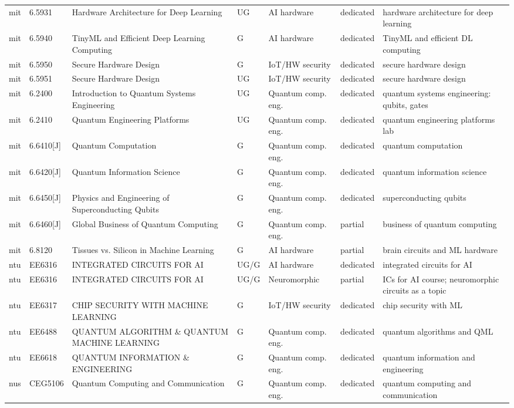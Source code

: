 \documentclass[10pt]{article}
\begin{document}
\begin{longtable}{@{}llL{4.6cm}llll@{}}
mit & 6.5931 & Hardware Architecture for Deep Learning & UG & AI hardware & dedicated & hardware architecture for deep learning \\
mit & 6.5940 & TinyML and Efficient Deep Learning Computing & G & AI hardware & dedicated & TinyML and efficient DL computing \\
mit & 6.5950 & Secure Hardware Design & G & IoT/HW security & dedicated & secure hardware design \\
mit & 6.5951 & Secure Hardware Design & UG & IoT/HW security & dedicated & secure hardware design \\
mit & 6.2400 & Introduction to Quantum Systems Engineering & UG & Quantum comp. eng. & dedicated & quantum systems engineering: qubits, gates \\
mit & 6.2410 & Quantum Engineering Platforms & UG & Quantum comp. eng. & dedicated & quantum engineering platforms lab \\
mit & 6.6410[J] & Quantum Computation & G & Quantum comp. eng. & dedicated & quantum computation \\
mit & 6.6420[J] & Quantum Information Science & G & Quantum comp. eng. & dedicated & quantum information science \\
mit & 6.6450[J] & Physics and Engineering of Superconducting Qubits & G & Quantum comp. eng. & dedicated & superconducting qubits \\
mit & 6.6460[J] & Global Business of Quantum Computing & G & Quantum comp. eng. & partial & business of quantum computing \\
mit & 6.8120 & Tissues vs. Silicon in Machine Learning & G & AI hardware & partial & brain circuits and ML hardware \\
ntu & EE6316 & INTEGRATED CIRCUITS FOR AI & UG/G & AI hardware & dedicated & integrated circuits for AI \\
ntu & EE6316 & INTEGRATED CIRCUITS FOR AI & UG/G & Neuromorphic & partial & ICs for AI course; neuromorphic circuits as a topic \\
ntu & EE6317 & CHIP SECURITY WITH MACHINE LEARNING & G & IoT/HW security & dedicated & chip security with ML \\
ntu & EE6488 & QUANTUM ALGORITHM \& QUANTUM MACHINE LEARNING & G & Quantum comp. eng. & dedicated & quantum algorithms and QML \\
ntu & EE6618 & QUANTUM INFORMATION \& ENGINEERING & G & Quantum comp. eng. & dedicated & quantum information and engineering \\
nus & CEG5106 & Quantum Computing and Communication & G & Quantum comp. eng. & dedicated & quantum computing and communication \\

\end{longtable}
\end{document}
